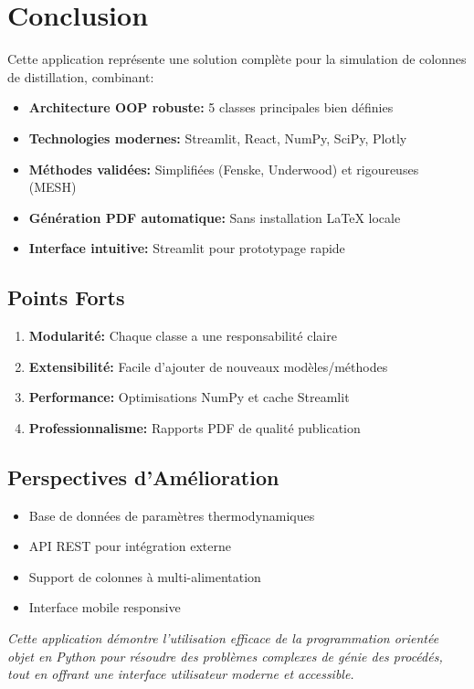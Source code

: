 \documentclass[11pt,a4paper]{article}
\begin{document}
\section{Conclusion}

Cette application représente une solution complète pour la simulation de colonnes de distillation, combinant:

\begin{itemize}
\item \textbf{Architecture OOP robuste:} 5 classes principales bien définies
\item \textbf{Technologies modernes:} Streamlit, React, NumPy, SciPy, Plotly
\item \textbf{Méthodes validées:} Simplifiées (Fenske, Underwood) et rigoureuses (MESH)
\item \textbf{Génération PDF automatique:} Sans installation LaTeX locale
\item \textbf{Interface intuitive:} Streamlit pour prototypage rapide
\end{itemize}

\subsection{Points Forts}

\begin{enumerate}
\item \textbf{Modularité:} Chaque classe a une responsabilité claire
\item \textbf{Extensibilité:} Facile d'ajouter de nouveaux modèles/méthodes
\item \textbf{Performance:} Optimisations NumPy et cache Streamlit
\item \textbf{Professionnalisme:} Rapports PDF de qualité publication
\end{enumerate}

\subsection{Perspectives d'Amélioration}

\begin{itemize}
\item Base de données de paramètres thermodynamiques
\item API REST pour intégration externe
\item Support de colonnes à multi-alimentation
\item Interface mobile responsive
\end{itemize}

\vspace{1cm}

\noindent\textit{Cette application démontre l'utilisation efficace de la programmation orientée objet en Python pour résoudre des problèmes complexes de génie des procédés, tout en offrant une interface utilisateur moderne et accessible.}
\end{document}
